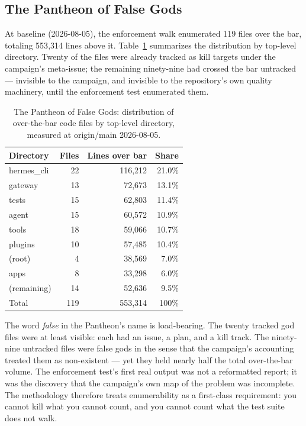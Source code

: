 \documentclass[11pt]{article}
\theoremstyle{definition}
\theoremstyle{plain}
\theoremstyle{remark}
\begin{document}
\subsection{The Pantheon of False Gods}

At baseline (2026-08-05), the enforcement walk enumerated 119 files over the
bar, totaling 553{,}314 lines above it. Table~\ref{tab:pantheon} summarizes
the distribution by top-level directory. Twenty of the files were already
tracked as kill targets under the campaign's meta-issue; the remaining
ninety-nine had crossed the bar untracked --- invisible to the campaign, and
invisible to the repository's own quality machinery, until the enforcement
test enumerated them.

\begin{table}[H]
\centering
\caption{The Pantheon of False Gods: distribution of over-the-bar code
files by top-level directory, measured at origin/main 2026-08-05.}
\label{tab:pantheon}
\begin{tabular}{lrrr}
\toprule
Directory & Files & Lines over bar & Share \\
\midrule
hermes\_cli & 22 & 116{,}212 & 21.0\% \\
gateway & 13 & 72{,}673 & 13.1\% \\
tests & 15 & 62{,}803 & 11.4\% \\
agent & 15 & 60{,}572 & 10.9\% \\
tools & 18 & 59{,}066 & 10.7\% \\
plugins & 10 & 57{,}485 & 10.4\% \\
(root) & 4 & 38{,}569 & 7.0\% \\
apps & 8 & 33{,}298 & 6.0\% \\
(remaining) & 14 & 52{,}636 & 9.5\% \\
\midrule
Total & 119 & 553{,}314 & 100\% \\
\bottomrule
\end{tabular}
\end{table}

The word \emph{false} in the Pantheon's name is load-bearing. The twenty
tracked god files were at least visible: each had an issue, a plan, and a
kill track. The ninety-nine untracked files were false gods in the sense
that the campaign's accounting treated them as non-existent --- yet they
held nearly half the total over-the-bar volume. The enforcement test's first
real output was not a reformatted report; it was the discovery that the
campaign's own map of the problem was incomplete. The methodology therefore
treats enumerability as a first-class requirement: you cannot kill what you
cannot count, and you cannot count what the test suite does not walk.
\end{document}
